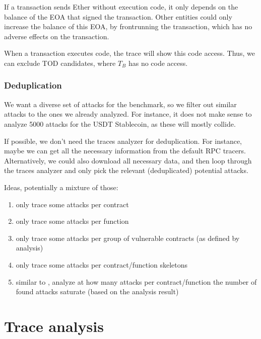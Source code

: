 \documentclass[draft,final]{vutinfth} %
\begin{document}
If a transaction sends Ether without execution code, it only depends on the balance of the EOA that signed the transaction. Other entities could only increase the balance of this EOA, by frontrunning the transaction, which has no adverse effects on the transaction.

When a transaction executes code, the trace will show this code access. Thus, we can exclude TOD candidates, where $T_B$ has no code access.


\subsection{Deduplication}

We want a diverse set of attacks for the benchmark, so we filter out similar attacks to the ones we already analyzed. For instance, it does not make sense to analyze 5000 attacks for the USDT Stablecoin, as these will mostly collide.

If possible, we don't need the traces analyzer for deduplication. For instance, maybe we can get all the necessary information from the default RPC tracers.
Alternatively, we could also download all necessary data, and then loop through the traces analyzer and only pick the relevant (deduplicated) potential attacks.

Ideas, potentially a mixture of those:

\begin{enumerate}
    \item only trace some attacks per contract
    \item only trace some attacks per function
    \item only trace some attacks per group of vulnerable contracts (as defined by analysis)
    \item only trace some attacks per contract/function skeletons
    \item similar to \cite{}, analyze at how many attacks per contract/function the number of found attacks saturate (based on the analysis result)
\end{enumerate}

\chapter{Trace analysis}
\end{document}
